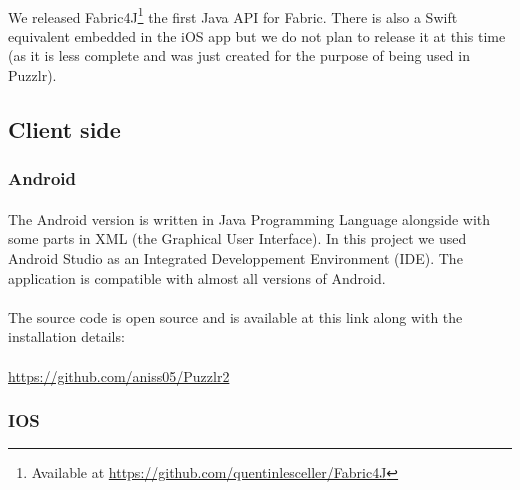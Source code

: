  			\paragraph{}
 			We released Fabric4J\footnote{Available at \url{https://github.com/quentinlesceller/Fabric4J}} the first Java API for Fabric. There is also a Swift equivalent embedded in the iOS app but we do not plan to release it at this time (as it is less complete and was just created for the purpose of being used in Puzzlr).
 	\subsection{Client side}
 		\subsubsection{Android}
  			\paragraph{}
			The Android version is written in Java Programming Language alongside with some parts in XML (the Graphical User Interface). In this project we used Android Studio as an Integrated Developpement Environment (IDE). The application is compatible with almost all versions of Android.
			\paragraph{}
			The source code is open source and is available at this link along with the installation details:
			\paragraph{}
			\color{blue}\underline{https://github.com/aniss05/Puzzlr2}\color{black} 
	  
	\subsubsection{IOS}